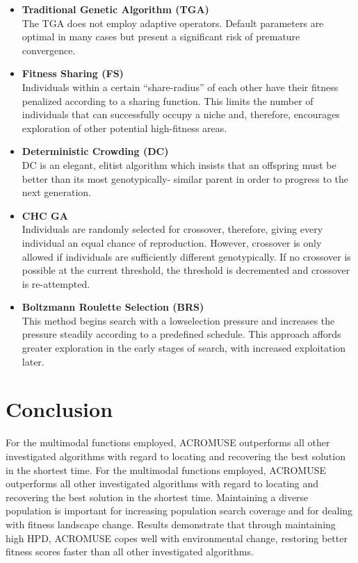 \documentclass[../main.tex]{subfiles}
\begin{document}
\begin{itemize}
	\item \textbf{Traditional Genetic Algorithm (TGA)} \\
	The TGA does not employ adaptive operators. Default parameters are optimal in many cases but present a significant
	risk of premature convergence.

	\item \textbf{Fitness Sharing (FS)} \\
	Individuals within a certain ``share-radius'' of each other have their fitness penalized according to a sharing
	function. This limits the number of individuals that can successfully occupy a niche and, therefore, encourages
	exploration of other potential high-fitness areas.

	\item \textbf{Deterministic Crowding (DC)} \\
	DC is an elegant, elitist algorithm which insists that an offspring must be better than its most genotypically-
	similar parent in order to progress to the next generation.

	\item \textbf{CHC GA} \\
	Individuals are randomly selected for crossover, therefore, giving every individual an equal chance of
	reproduction. However, crossover is only allowed if individuals are sufficiently different genotypically. If no
	crossover is possible at the current threshold, the threshold is decremented and
	crossover is re-attempted.

	\item \textbf{Boltzmann Roulette Selection (BRS)} \\
	This method begins search with a lowselection pressure and increases the pressure steadily according to a
	predefined schedule. This approach affords greater exploration in the early stages of search, with increased
	exploitation later.
\end{itemize}

\section{Conclusion}
For the multimodal functions employed, ACROMUSE outperforms all other investigated algorithms with regard to locating
and recovering the best solution in the shortest time. For the multimodal functions employed, ACROMUSE outperforms all
other investigated algorithms with regard to locating and recovering the best solution in the shortest time.
Maintaining a diverse population is important for increasing population search coverage and for dealing with fitness
landscape change. Results demonstrate that through maintaining high HPD, ACROMUSE copes well with environmental change,
restoring better fitness scores faster than all other investigated algorithms.
\end{document}
